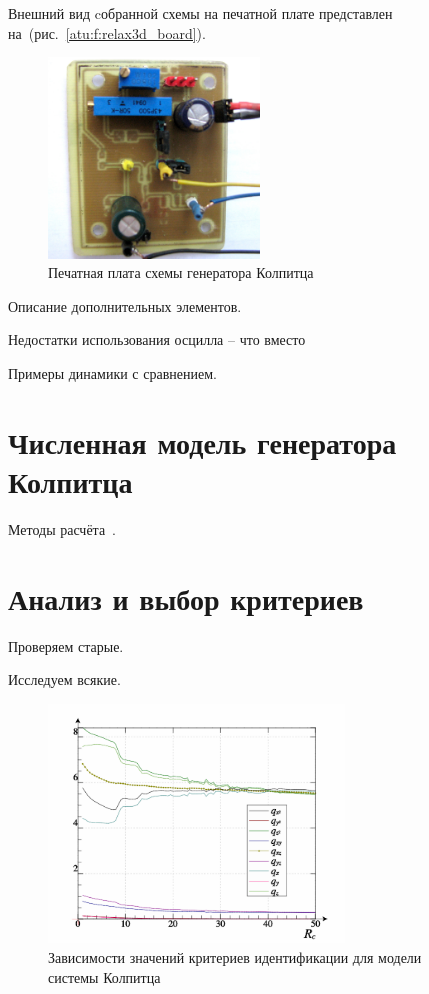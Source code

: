 Внешний вид cобранной схемы на печатной плате представлен на~(рис.~\ref{atu:f:relax3d_board}).

\begin{figure}[htb!]
\centerline{\includegraphics[width=0.5\textwidth]{p/colp_board.jpg} }
\caption{Печатная плата схемы генератора Колпитца}
\label{atu:f:colp_board}
\end{figure}


Описание дополнительных элементов.

Недостатки использования осцилла -- что вместо

Примеры динамики с сравнением.

\section{Численная модель генератора Колпитца}

Методы расчёта~\cite{zaeplnii_radio_calc}.

\section{Анализ и выбор критериев}

Проверяем старые.

Исследуем всякие.

\begin{figure}[htb!]
\centerline{\includegraphics[width=0.7\textwidth]{p/colp_bjt_q-p_Rc_q.png} }
\caption{Зависимости значений критериев идентификации для модели системы Колпитца}
\label{atu:colp_bjt_q-p_Rc_q}
\end{figure}


